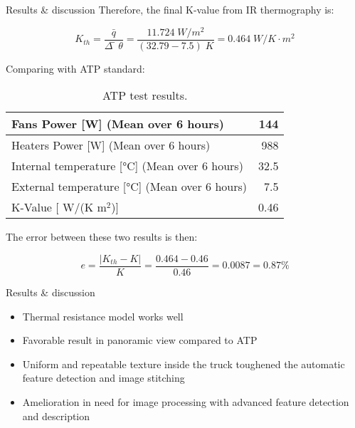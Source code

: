 \begin{frame}{Results \& discussion}
 Therefore, the final K-value from IR thermography is:

    \begin{equation*}
    K_{th}=\frac{\bar{q}}{\Delta ̅\theta} =\frac{11.724\; W/m^2}{(32.79-7.5)\;K}=0.464\; W/K\cdot m^2 
    \end{equation*}

\pause
Comparing with ATP standard:
    \begin{table}[ht]
        \centering
        \caption{ATP test results.}
        \begin{tabular}{l|r}
            \hline
            Fans Power [W] (Mean over 6 hours) & 144 \\
            \hline 
            Heaters Power [W] (Mean over 6 hours) &   988\\
            \hline
            Internal temperature [°C] (Mean over 6 hours) &   32.5\\
            \hline
            External temperature [°C] (Mean over 6 hours) &   7.5\\
            \hline
            K-Value [ W/(K m$^2 $)] & 0.46 \\
            \hline
        \end{tabular}
    \end{table}
\pause
The error between these two results is then:

    \begin{equation*}
        e=  \frac{|K_{th}-K|}{K}=\frac{0.464-0.46}{0.46}=0.0087=0.87\%
    \end{equation*}
\end{frame}

\begin{frame}{Results \& discussion}
    \begin{itemize}[<+->]
    \pause
    \large
        \item Thermal resistance model works well
        \item Favorable result in panoramic view compared to ATP
        \item Uniform and repeatable texture inside the truck toughened the automatic feature detection and image stitching
        \item Amelioration in need for image processing with advanced feature detection and description
    \end{itemize}
\end{frame}
